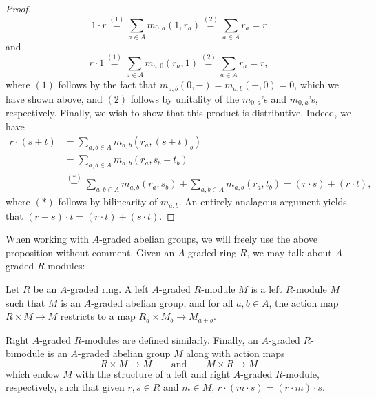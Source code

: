 \documentclass[../main.tex]{subfiles}
\begin{document}
\begin{proof}
	\[1\cdot r\overset{(1)}=\sum_{a\in A}m_{0,a}(1,r_a)\overset{(2)}=\sum_{a\in A}r_a=r\]
	and
	\[r\cdot 1\overset{(1)}=\sum_{a\in A}m_{a,0}(r_a,1)\overset{(2)}=\sum_{a\in A}r_a=r,\]
	where $(1)$ follows by the fact that $m_{a,b}(0,-)=m_{a,b}(-,0)=0$, which we have shown above, and $(2)$ follows by unitality of the $m_{0,a}$'s and $m_{0,a}$'s, respectively. Finally, we wish to show that this product is distributive. Indeed, we have
	\begin{align*}
		r\cdot(s+t)&=\sum_{a,b\in A}m_{a,b}(r_a,(s+t)_b) \\
		&=\sum_{a,b\in A}m_{a,b}(r_a,s_b+t_b) \\
		&\overset{(*)}=\sum_{a,b\in A}m_{a,b}(r_a,s_b)+\sum_{a,b\in A}m_{a,b}(r_a,t_b)=(r\cdot s)+(r\cdot t),
	\end{align*}
	where $(*)$ follows by bilinearity of $m_{a,b}$. An entirely analagous argument yields that $(r+s)\cdot t=(r\cdot t)+(s\cdot t)$.
\end{proof}

When working with $A$-graded abelian groups, we will freely use the above proposition without comment. Given an $A$-graded ring $R$, we may talk about $A$-graded $R$-modules:

\begin{definition}
	Let $R$ be an $A$-graded ring. A left $A$-graded $R$-module $M$ is a left $R$-module $M$ such that $M$ is an $A$-graded abelian group, and for all $a,b\in A$, the action map $R\times M\to M$ restricts to a map $R_a\times M_b\to M_{a+b}$.
	
	Right $A$-graded $R$-modules are defined similarly. Finally, an $A$-graded $R$-bimodule is an $A$-graded abelian group $M$ along with action maps
	\[R\times M\to M\qquad\text{and}\qquad M\times R\to M\]
	which endow $M$ with the structure of a left and right $A$-graded $R$-module, respectively, such that given $r,s\in R$ and $m\in M$, $r\cdot(m\cdot s)=(r\cdot m)\cdot s$.
\end{definition}
\end{document}
